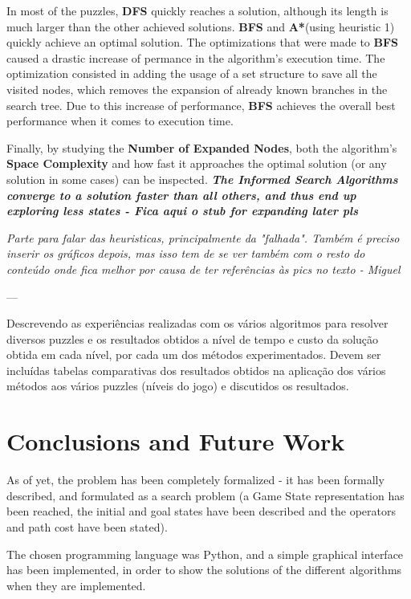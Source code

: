 \documentclass[conference]{IEEEtran}
\begin{document}
In most of the puzzles, \textbf{DFS} quickly reaches a solution, although its length is much larger than the other achieved solutions. \textbf{BFS} and \textbf{A*}(using heuristic 1) quickly achieve an optimal solution. The optimizations that were made to \textbf{BFS} caused a drastic increase of permance in the algorithm's execution time. The optimization consisted in adding the usage of a set structure to save all the visited nodes, which removes the expansion of already known branches in the search tree. Due to this increase of performance, \textbf{BFS} achieves the overall best performance when it comes to execution time.

Finally, by studying the \textbf{Number of Expanded Nodes}, both the algorithm's \textbf{Space Complexity} and how fast it approaches the optimal solution (or any solution in some cases) can be inspected. \textbf{\textit{The \textbf{Informed Search Algorithms} converge to a solution faster than all others, and thus end up exploring less states - Fica aqui o stub for expanding later pls}}

\begin{bf}
\textit{
Parte para falar das heuristicas, principalmente da "falhada". Tamb\'em \'e preciso inserir os gr\'aficos depois, mas isso tem de se ver tamb\'em com o resto do conte\'udo onde fica melhor por causa de ter referências às pics no texto - Miguel
}
\end{bf}

---

Descrevendo as experiências realizadas com os vários algoritmos para resolver diversos puzzles e os resultados obtidos a nível de tempo e custo da solução obtida em cada nível, por cada um dos métodos experimentados. Devem ser incluídas tabelas comparativas dos resultados obtidos na aplicação dos vários métodos aos vários puzzles (níveis do jogo) e discutidos os resultados.

\section{Conclusions and Future Work}
As of yet, the problem has been completely formalized - it has been formally described, and formulated as a search problem (a Game State representation has been reached, the initial and goal states have been described and the operators and path cost have been stated).

The chosen programming language was Python, and a simple graphical interface has been implemented, in order to show the solutions of the different algorithms when they are implemented.
\end{document}
